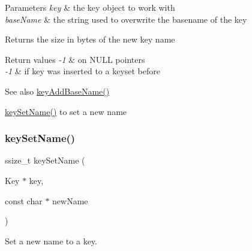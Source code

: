 \begin{DoxyParams}{Parameters}
{\em key} & the key object to work with \\
\hline
{\em base\+Name} & the string used to overwrite the basename of the key \\
\hline
\end{DoxyParams}
\begin{DoxyReturn}{Returns}
the size in bytes of the new key name 
\end{DoxyReturn}

\begin{DoxyRetVals}{Return values}
{\em -\/1} & on N\+U\+LL pointers \\
\hline
{\em -\/1} & if key was inserted to a keyset before \\
\hline
\end{DoxyRetVals}
\begin{DoxySeeAlso}{See also}
\hyperlink{group__keyname_gaa942091fc4bd5c2699e49ddc50829524}{key\+Add\+Base\+Name()} 

\hyperlink{group__keyname_ga7699091610e7f3f43d2949514a4b35d9}{key\+Set\+Name()} to set a new name 
\end{DoxySeeAlso}
\mbox{\label{group__keyname_ga7699091610e7f3f43d2949514a4b35d9}} 
\subsubsection{\texorpdfstring{key\+Set\+Name()}{keySetName()}}
{\footnotesize\ttfamily ssize\+\_\+t key\+Set\+Name (\begin{DoxyParamCaption}\item[{Key $\ast$}]{key,  }\item[{const char $\ast$}]{new\+Name }\end{DoxyParamCaption})}



Set a new name to a key. 


